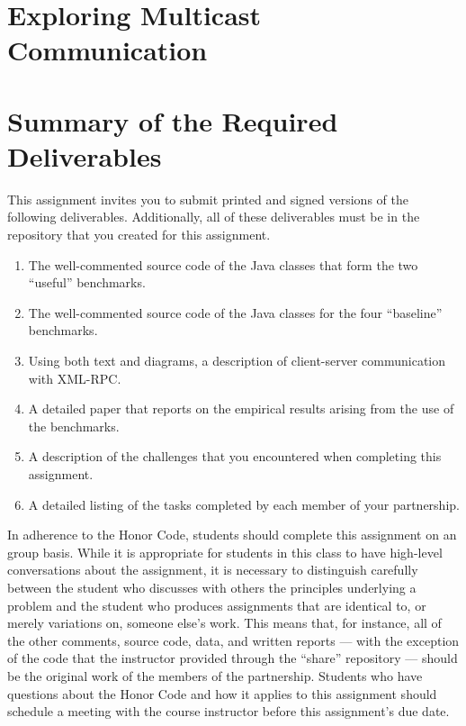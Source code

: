 \section*{Exploring Multicast Communication}



\section*{Summary of the Required Deliverables}

This assignment invites you to submit printed and signed versions of the following deliverables. Additionally,
all of these deliverables must be in the repository that you created for this assignment.

\vspace*{-.15in}

\begin{enumerate}
  \itemsep 0em

    \item The well-commented source code of the Java classes that form the two ``useful'' benchmarks.

    \item The well-commented source code of the Java classes for the four ``baseline'' benchmarks.

    \item Using both text and diagrams, a description of client-server communication with XML-RPC.

    \item A detailed paper that reports on the empirical results arising from the use of the benchmarks.

    \item A description of the challenges that you encountered when completing this assignment.

    \item A detailed listing of the tasks completed by each member of your partnership.

\end{enumerate}

\vspace*{-.15in}


In adherence to the Honor Code, students should complete this assignment on an group basis. While it is appropriate for
students in this class to have high-level conversations about the assignment, it is necessary to distinguish carefully
between the student who discusses with others the principles underlying a problem and the student who produces
assignments that are identical to, or merely variations on, someone else's work.  This means that, for instance, all of
the other comments, source code, data, and written reports --- with the exception of the code that the instructor
provided through the ``share'' repository --- should be the original work of the members of the partnership.  Students
who have questions about the Honor Code and how it applies to this assignment should schedule a meeting with the course
instructor before this assignment's due date.


